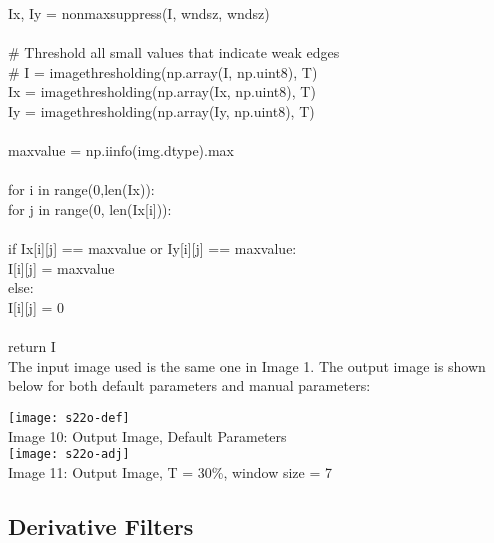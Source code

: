 \documentclass{article}
\begin{document}
	\indent I\textunderscore x, I\textunderscore y = non\textunderscore max\textunderscore suppress(I, wndsz, wndsz)\\
	\\
	\indent \# Threshold all small values that indicate weak edges\\
	\indent \# I = image\textunderscore thresholding(np.array(I, np.uint8), T)\\
	\indent I\textunderscore x = image\textunderscore thresholding(np.array(I\textunderscore x, np.uint8), T)\\
	\indent I\textunderscore y = image\textunderscore thresholding(np.array(I\textunderscore y, np.uint8), T)\\
	\\
	\indent max\textunderscore value = np.iinfo(img.dtype).max\\
	\\
	\indent for i in range(0,len(I\textunderscore x)):\\
	\indent \indent for j in range(0, len(I\textunderscore x[i])):\\
	\\
	\indent \indent \indent if I\textunderscore x[i][j] == max\textunderscore value or I\textunderscore y[i][j] == max\textunderscore value:\\
	\indent \indent \indent \indent I[i][j] = max\textunderscore value\\
	\indent \indent \indent else:\\
	\indent \indent \indent I[i][j] = 0\\
	\\
	\indent return I\\
	
	The input image used is the same one in Image 1. The output image is shown below for both default parameters and manual parameters:\\
	
	\begin{center}
		\noindent \texttt{[image: s22o-def]}\\
		Image 10: Output Image, Default Parameters\\
		
		\texttt{[image: s22o-adj]}\\
		Image 11: Output Image, T = 30\%, window size = 7 \\
		
	\end{center}

	\subsection{Derivative Filters}
	
\end{document}
